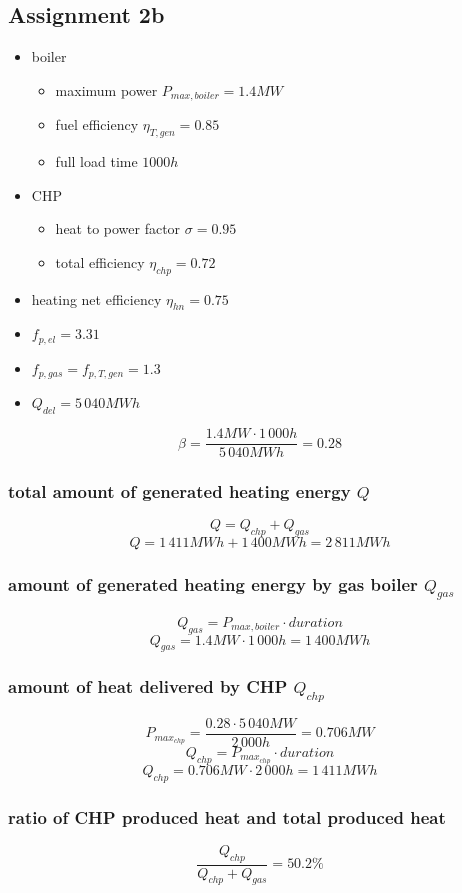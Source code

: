 \documentclass{article}
\begin{document}
	\subsection*{Assignment 2b}
		\begin{itemize}
			\item boiler
				\begin{itemize}
					\item maximum power $P_{max,boiler}=1.4MW$
					\item fuel efficiency $\eta_{T,gen}=0.85$
					\item full load time $1000h$
				\end{itemize}
			\item CHP
				\begin{itemize}
					\item heat to power factor $\sigma=0.95$
					\item total efficiency $\eta_{chp}=0.72$
				\end{itemize}
			\item heating net efficiency $\eta_{hn}=0.75$
			\item $f_{p,el}=3.31$
			\item $f_{p,gas}=f_{p,T,gen}=1.3$
			\item $Q_{del}=5\,040MWh$
		\end{itemize}

		$$\beta=\frac{1.4MW\cdot 1\,000h}{5\,040MWh}=0.28$$

		\subsubsection*{total amount of generated heating energy $Q$}
			$$Q=Q_{chp}+Q_{gas}$$
			$$Q=1\,411MWh+1\,400MWh=2\,811MWh$$
		\subsubsection*{amount of generated heating energy by gas boiler $Q_{gas}$}
			$$Q_{gas}=P_{max,boiler}\cdot duration$$
			$$Q_{gas}=1.4MW\cdot 1\,000h=1\,400MWh$$
		\subsubsection*{amount of heat delivered by CHP $Q_{chp}$}
			$$P_{max_{chp}}=\frac{0.28\cdot 5\,040MW}{2\,000h}=0.706MW$$
			$$Q_{chp}=P_{max_{chp}}\cdot duration$$
			$$Q_{chp}=0.706MW\cdot 2\,000h = 1\,411MWh$$
		\subsubsection*{ratio of CHP produced heat and total produced heat}
			$$\frac{Q_{chp}}{Q_{chp}+Q_{gas}}=50.2\%$$
\end{document}
